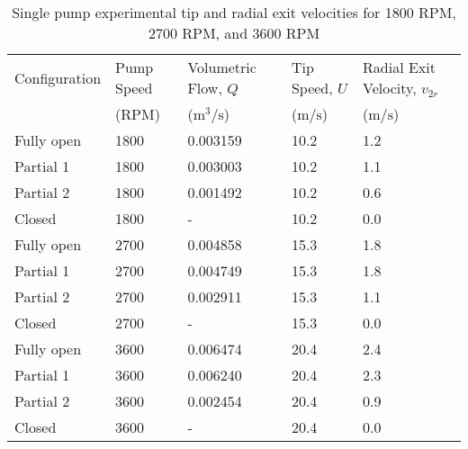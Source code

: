 \begin{table}[H]
    \centering
    \caption{Single pump experimental tip and radial exit velocities for 1800 RPM, 2700 RPM, and 3600 RPM}
    \label{tab:single_pump_head_and_flow_coefficients}
    \begin{tabular}{lC{0.15\textwidth}C{0.15\textwidth}C{0.15\textwidth}C{0.15\textwidth}}
    \toprule
    Configuration & Pump Speed & Volumetric Flow, $Q$ & Tip Speed, $U$ & Radial Exit Velocity, $v_{2r}$ \\
    & (RPM) & ($\unit{\meter\cubed\per\second}$) & ($\unit{\meter\per\second}$) & ($\unit{\meter\per\second}$) \\
    \midrule
    Fully open & 1800 & 0.003159 & 10.2 & 1.2 \\
    Partial 1 & 1800 & 0.003003 & 10.2 & 1.1 \\
    Partial 2 & 1800 & 0.001492 & 10.2 & 0.6 \\
    Closed & 1800 & - & 10.2 & 0.0 \\
    Fully open & 2700 & 0.004858 & 15.3 & 1.8 \\
    Partial 1 & 2700 & 0.004749 & 15.3 & 1.8 \\
    Partial 2 & 2700 & 0.002911 & 15.3 & 1.1 \\
    Closed & 2700 & - & 15.3 & 0.0 \\
    Fully open & 3600 & 0.006474 & 20.4 & 2.4 \\
    Partial 1 & 3600 & 0.006240 & 20.4 & 2.3 \\
    Partial 2 & 3600 & 0.002454 & 20.4 & 0.9 \\
    Closed & 3600 & - & 20.4 & 0.0 \\
    \bottomrule
    \end{tabular}
\end{table}
